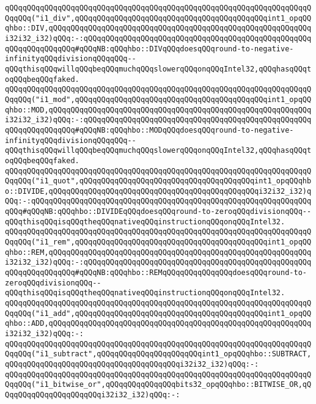 \verb|qQQqqQQqqQQqqQQqqQQqqQQqqQQqqQQqqQQqqQQqqQQqqQQqqQQqqQQqqQQqqQQqqQQqqQQqqQQq("i1_div",qQQqqQQqqQQqqQQqqQQqqQQqqQQqqQQqqQQqqQQqqQQqint1_opqQQqhbo::DIV,qQQqqQQqqQQqqQQqqQQqqQQqqQQqqQQqqQQqqQQqqQQqqQQqqQQqqQQqqQQqi32i32_i32)qQQq:-:qQQqqQQqqQQqqQQqqQQqqQQqqQQqqQQqqQQqqQQqqQQqqQQqqQQqqQQqqQQqqQQqqQQq#qQQqNB:qQQqhbo::DIVqQQqdoesqQQqround-to-negative-infinityqQQqdivisionqQQqqQQq--qQQqthisqQQqwillqQQqbeqQQqmuchqQQqslowerqQQqonqQQqIntel32,qQQqhasqQQqtoqQQqbeqQQqfaked.|\newline
\verb|qQQqqQQqqQQqqQQqqQQqqQQqqQQqqQQqqQQqqQQqqQQqqQQqqQQqqQQqqQQqqQQqqQQqqQQqqQQq("i1_mod",qQQqqQQqqQQqqQQqqQQqqQQqqQQqqQQqqQQqqQQqqQQqint1_opqQQqhbo::MOD,qQQqqQQqqQQqqQQqqQQqqQQqqQQqqQQqqQQqqQQqqQQqqQQqqQQqqQQqqQQqi32i32_i32)qQQq:-:qQQqqQQqqQQqqQQqqQQqqQQqqQQqqQQqqQQqqQQqqQQqqQQqqQQqqQQqqQQqqQQqqQQq#qQQqNB:qQQqhbo::MODqQQqdoesqQQqround-to-negative-infinityqQQqdivisionqQQqqQQq--qQQqthisqQQqwillqQQqbeqQQqmuchqQQqslowerqQQqonqQQqIntel32,qQQqhasqQQqtoqQQqbeqQQqfaked.|\newline
\verb|qQQqqQQqqQQqqQQqqQQqqQQqqQQqqQQqqQQqqQQqqQQqqQQqqQQqqQQqqQQqqQQqqQQqqQQqqQQq("i1_quot",qQQqqQQqqQQqqQQqqQQqqQQqqQQqqQQqqQQqqQQqint1_opqQQqhbo::DIVIDE,qQQqqQQqqQQqqQQqqQQqqQQqqQQqqQQqqQQqqQQqqQQqqQQqi32i32_i32)qQQq:-:qQQqqQQqqQQqqQQqqQQqqQQqqQQqqQQqqQQqqQQqqQQqqQQqqQQqqQQqqQQqqQQqqQQq#qQQqNB:qQQqhbo::DIVIDEqQQqdoesqQQqround-to-zeroqQQqdivisionqQQq--qQQqthisqQQqisqQQqtheqQQqnativeqQQqinstructionqQQqonqQQqIntel32.|\newline
\verb|qQQqqQQqqQQqqQQqqQQqqQQqqQQqqQQqqQQqqQQqqQQqqQQqqQQqqQQqqQQqqQQqqQQqqQQqqQQq("i1_rem",qQQqqQQqqQQqqQQqqQQqqQQqqQQqqQQqqQQqqQQqqQQqint1_opqQQqhbo::REM,qQQqqQQqqQQqqQQqqQQqqQQqqQQqqQQqqQQqqQQqqQQqqQQqqQQqqQQqqQQqi32i32_i32)qQQq:-:qQQqqQQqqQQqqQQqqQQqqQQqqQQqqQQqqQQqqQQqqQQqqQQqqQQqqQQqqQQqqQQqqQQq#qQQqNB:qQQqhbo::REMqQQqqQQqqQQqqQQqdoesqQQqround-to-zeroqQQqdivisionqQQq--qQQqthisqQQqisqQQqtheqQQqnativeqQQqinstructionqQQqonqQQqIntel32.|\newline
\verb|qQQqqQQqqQQqqQQqqQQqqQQqqQQqqQQqqQQqqQQqqQQqqQQqqQQqqQQqqQQqqQQqqQQqqQQqqQQq("i1_add",qQQqqQQqqQQqqQQqqQQqqQQqqQQqqQQqqQQqqQQqqQQqint1_opqQQqhbo::ADD,qQQqqQQqqQQqqQQqqQQqqQQqqQQqqQQqqQQqqQQqqQQqqQQqqQQqqQQqqQQqi32i32_i32)qQQq:-:|\newline
\verb|qQQqqQQqqQQqqQQqqQQqqQQqqQQqqQQqqQQqqQQqqQQqqQQqqQQqqQQqqQQqqQQqqQQqqQQqqQQq("i1_subtract",qQQqqQQqqQQqqQQqqQQqqQQqint1_opqQQqhbo::SUBTRACT,qQQqqQQqqQQqqQQqqQQqqQQqqQQqqQQqqQQqqQQqi32i32_i32)qQQq:-:|\newline
\verb|qQQqqQQqqQQqqQQqqQQqqQQqqQQqqQQqqQQqqQQqqQQqqQQqqQQqqQQqqQQqqQQqqQQqqQQqqQQq("i1_bitwise_or",qQQqqQQqqQQqqQQqbits32_opqQQqhbo::BITWISE_OR,qQQqqQQqqQQqqQQqqQQqqQQqi32i32_i32)qQQq:-:|\newline
